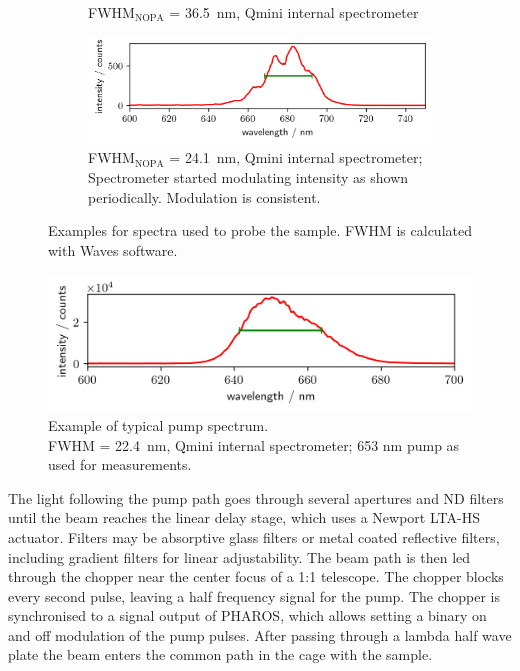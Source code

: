 \documentclass[twoside,openright,listof=numbered]{scrreprt}
\begin{document}
\begin{figure}[hbtp]
\begin{subfigure}[b]{\textwidth}
\caption{FWHM$_{\mathrm{NOPA}}$ = \SI{36.5}{\nano\meter}, Qmini internal spectrometer}
\end{subfigure}
\begin{subfigure}[b]{\textwidth}
\centering
\includegraphics[scale=1]{images/spectra/2024-02-05/probe_3H_680nm.png}
\caption{FWHM$_{\mathrm{NOPA}}$ = \SI{24.1}{\nano\meter}, Qmini internal spectrometer; Spectrometer started modulating intensity as shown periodically. Modulation is consistent.\label{fig:spectrometerMalfunction}}
\end{subfigure}
\caption[Examples for spectra used to probe the sample.]{Examples for spectra used to probe the sample. FWHM is calculated with Waves software.\label{fig:probeSpectra}}
\end{figure}

\begin{figure}[hbt]
\centering
\includegraphics[scale=1]{images/spectra/2024-02-05/pump_2H_653nm.png}
\caption[Example of typical \qty{653}{\nano\meter} pump spectrum.]{Example of typical pump spectrum.\\ FWHM = \SI{22.4}{\nano\meter}, Qmini internal spectrometer; 653 nm pump as used for measurements. \label{fig:specRefPump}}
\end{figure}

The light following the pump path goes through several apertures and ND filters until the beam reaches the linear delay stage, which uses a Newport LTA-HS actuator.  Filters may be absorptive glass filters or metal coated reflective filters, including gradient filters for linear adjustability.  The beam path is then led through the chopper near the center focus of a  1:1 telescope. The chopper blocks every second pulse, leaving a half frequency signal for the pump. The chopper is synchronised to a signal output of PHAROS, which allows setting a binary on and off modulation of the pump pulses. After passing through a lambda half wave plate the beam enters the common path in the cage with the sample.
\end{document}
